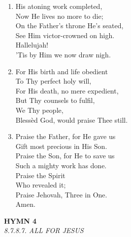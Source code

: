 \documentclass[11pt,a4paper]{article}
\begin{document}
\begin{enumerate}
    \item His atoning work completed, \\
        Now He lives no more to die; \\
        On the Father's throne He's seated, \\
        See Him victor-crowned on high. \\
        Hallelujah! \\
        'Tis by Him we now draw nigh.

    \item For His birth and life obedient \\
        To Thy perfect holy will, \\
        For His death, no mere expedient, \\
        But Thy counsels to fulfil, \\
        We Thy people, \\
        Bless\`ed God, would praise Thee still.

    \item Praise the Father, for He gave us \\
        Gift most precious in His Son. \\
        Praise the Son, for He to save us \\
        Such a mighty work has done. \\
        Praise the Spirit \\
        Who revealed it; \\
        Praise Jehovah, Three in One. \\
        Amen.

\end{enumerate}

\newpage
\begin{center}
    {\Large \textbf{HYMN 4}}
    \\
    \textit{8.7.8.7. ALL FOR JESUS}
\end{center}
\vspace{1em}
\end{document}

